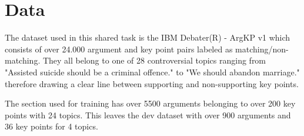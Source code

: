 \section{Data}\label{data}

The dataset used in this shared task is the IBM Debater(R) - ArgKP v1 \cite{Bar-HaimEFKLS2020} which consists of over 
24.000 argument and key point pairs labeled as matching/non-matching.
They all belong to one of 28 controversial topics ranging from "Assisted suicide should be a criminal offence." to 
"We should abandon marriage." therefore drawing a clear line between supporting and non-supporting key points.

The section used for training has over 5500 arguments belonging to over 200 key points with 24 topics. This leaves the 
dev dataset with over 900 arguments and 36 key points for 4 topics.

